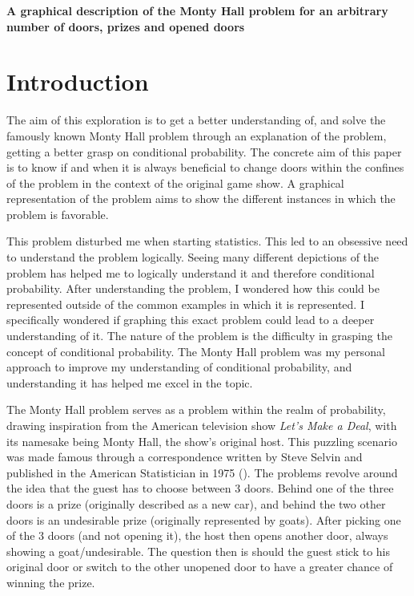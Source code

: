 \documentclass{article}
\begin{document}
\pagestyle{fancy}
\fancyhead[R]{}
\fancyhead[C]{}
\renewcommand{\headrulewidth}{0.4pt}
\renewcommand{\footrulewidth}{2pt}

\begin{center}
    \LARGE{\textbf{A graphical description of the Monty Hall problem for an arbitrary number of doors, prizes and opened doors}}
\end{center}
\section*{Introduction}
The aim of this exploration is to get a better understanding of, and solve the famously known Monty Hall problem through an explanation of the problem, getting a better grasp on conditional probability. The concrete aim of this paper is to know if and when it is always beneficial to change doors within the confines of the problem in the context of the original game show. A graphical representation of the problem aims to show the different instances in which the problem is favorable.
\par
This problem disturbed me when starting statistics. This led to an obsessive need to understand the problem logically. Seeing many different depictions of the problem has helped me to logically understand it and therefore conditional probability. After understanding the problem, I wondered how this could be represented outside of the common examples in which it is represented. I specifically wondered if graphing this exact problem could lead to a deeper understanding of it. The nature of the problem is the difficulty in grasping the concept of conditional probability. The Monty Hall problem was my personal approach to improve my understanding of conditional probability, and understanding it has helped me excel in the topic.
\par
The Monty Hall problem serves as a problem within the realm of probability, drawing inspiration from the American television show \textit{Let's Make a Deal}, with its namesake being Monty Hall, the show's original host. This puzzling scenario was made famous through a correspondence written by Steve Selvin and published in the American Statistician in 1975 (\cite{Stev-1975}). The problems revolve around the idea that the guest has to choose between 3 doors. Behind one of the three doors is a prize (originally described as a new car), and behind the two other doors is an undesirable prize (originally represented by goats). After picking one of the 3 doors (and not opening it), the host then opens another door, always showing a goat/undesirable. The question then is should the guest stick to his original door or switch to the other unopened door to have a greater chance of winning the prize.
\end{document}
